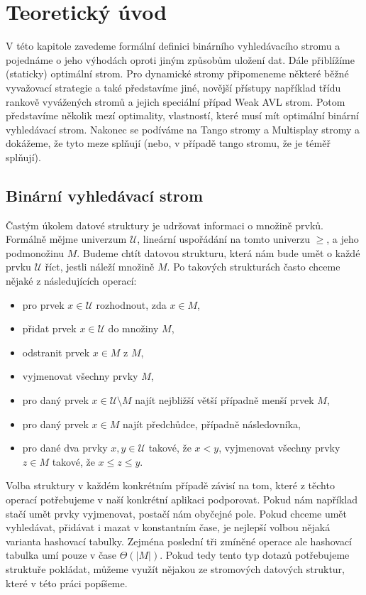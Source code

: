 \chapter{Teoretický úvod}

V této kapitole zavedeme formální definici binárního vyhledávacího stromu a
pojednáme o jeho výhodách oproti jiným způsobům uložení dat. Dále přiblížíme
(staticky) optimální strom. Pro dynamické stromy připomeneme některé běžné
vyvažovací strategie a také představíme jiné, novější přístupy například třídu
rankově vyvážených stromů a jejich speciální případ Weak AVL strom. Potom
představíme několik mezí optimality, vlastností, které musí mít optimální
binární vyhledávací strom. Nakonec se podíváme na Tango stromy a Multisplay
stromy a dokážeme, že tyto meze splňují (nebo, v případě tango stromu, že je
téměř splňují).

\section{Binární vyhledávací strom}
\def\U{\mathcal U}
\def\o{\mathcal O}

Častým úkolem datové struktury je udržovat informaci o množině prvků. Formálně mějme univerzum $\mathcal U$, lineární uspořádání na tomto univerzu $\geq$, a jeho podmonožinu $M$. Budeme chtít datovou strukturu, která nám bude umět o každé prvku $\mathcal U$ říct, jestli náleží množině $M$. Po takových strukturách často chceme nějaké z následujících operací:
\begin{itemize}
\item pro prvek $x \in \U$ rozhodnout, zda $x\in M$,
\item přidat prvek $x \in \U$ do množiny $M$,
\item odstranit prvek $x\in M$ z $M$,
\item vyjmenovat všechny prvky $M$,
\item pro daný prvek $x\in \U \setminus M$ najít nejbližší větší případně menší prvek $M$,
\item pro daný prvek $x\in M$ najít předchůdce, případně následovníka,
\item pro dané dva prvky $x,y\in\U$ takové, že $x<y$, vyjmenovat všechny prvky $z\in M$ takové, že $x \leq z \leq y$.
\end{itemize}

Volba struktury v každém konkrétním případě závisí na tom, které z těchto operací potřebujeme v naší konkrétní aplikaci podporovat. Pokud nám například stačí umět prvky vyjmenovat, postačí nám obyčejné pole. Pokud chceme umět vyhledávat, přidávat i mazat v konstantním čase, je nejlepší volbou nějaká varianta hashovací tabulky. Zejména poslední tři zmíněné operace ale hashovací tabulka umí pouze v čase $\Theta(|M|)$. Pokud tedy tento typ dotazů potřebujeme struktuře pokládat, můžeme využít nějakou ze stromových datových struktur, které v této práci popíšeme.

